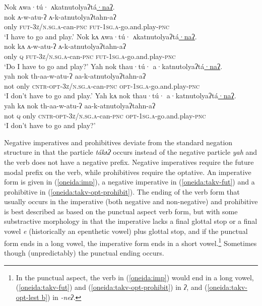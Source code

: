 \documentclass[output=paper,colorlinks,citecolor=brown]{langscibook}
\begin{document}
\ea
\label{oneida:must}
    \ea\label{oneida:must-a}
        \glll Nok ʌwa·tú· ʌkatnutolyaʔtá\uline{·naʔ}.  \\
        nok ʌ-w-atu-ʔ  ʌ-k-atnutolyaʔtahn-aʔ  \\
        only \textsc{fut-3z/n.sg.a}-can-\textsc{pnc} \textsc{fut-1sg.a}-go.and.play-\textsc{pnc} \\
        \glt `I have to go and play.' 
    \ex\label{oneida:must-b}
        \glll Nok kʌ ʌwa·tú· ʌkatnutolyaʔtá\uline{·naʔ}.  \\
        nok kʌ ʌ-w-atu-ʔ  ʌ-k-atnutolyaʔtahn-aʔ  \\
        only \textsc{q} \textsc{fut-3z/n.sg.a}-can-\textsc{pnc} \textsc{fut-1sg.a}-go.and.play-\textsc{pnc} \\
        \glt `Do I have to go and play?'
    \ex\label{oneida:must-c}
        \glll Yah nok thau·tú· a·katnutolyaʔtá\uline{·naʔ}. \\
        yah nok th-aa-w-atu-ʔ  aa-k-atnutolyaʔtahn-aʔ \\
        not only \textsc{cntr-opt-3z/n.sg.a}-can-\textsc{pnc} \textsc{opt-1sg.a}-go.and.play-\textsc{pnc}  \\
        \glt `I don't have to go and play.'
    \ex\label{oneida:must-d}
        \glll Yah kʌ nok thau·tú· a·katnutolyaʔtá\uline{·naʔ}.   \\
        yah kʌ nok th-aa-w-atu-ʔ aa-k-atnutolyaʔtahn-aʔ   \\
        not \textsc{q} only \textsc{cntr-opt-3z/n.sg.a}-can-\textsc{pnc} \textsc{opt-1sg.a}-go.and.play-\textsc{pnc} \\
        \glt `I don't have to go and play?'
    \z
\z


Negative imperatives and prohibitives deviate from the standard negation structure in that the particle \textit{tákʌʔ} occurs instead of the negative particle \textit{yah} and the verb does not have a negative prefix. Negative imperatives require the future modal prefix on the verb, while prohibitives require the optative. An imperative form is given in (\ref{oneida:imp}), a negative imperative in (\ref{oneida:takv-fut}) and a prohibitive in (\ref{oneida:takv-opt-prohibit}). The ending of the verb form that usually occurs in the imperative (both negative and non-negative) and prohibitive is best described as based on the punctual aspect verb form, but with some substractive morphology in that the imperative lacks a final glottal stop or a final vowel \textit{e} (historically an epenthetic vowel) plus glottal stop, and if the punctual form ends in a long vowel, the imperative form ends in a short vowel.\footnote{In the punctual aspect, the verb in (\ref{oneida:imp}) would end in a long vowel, (\ref{oneida:takv-fut}) and (\ref{oneida:takv-opt-prohibit}) in \textit{ʔ}, and (\ref{oneida:takv-opt-lest b}) in \textit{-neʔ}.} Sometimes though (unpredictably) the punctual ending occurs.
\end{document}
